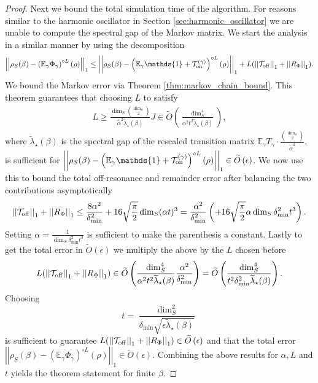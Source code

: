 \documentclass{article}
\newcommand{\on}{\rm on}
\newcommand{\off}{\rm off}
\newcommand{\norm}[1]{\left|\left| #1 \right|\right|}
\newcommand{\EE}{\mathbb{E}}
\newcommand{\TT}{\mathcal{T}}
\newcommand{\bigotilde}[1]{\widetilde{O} \left( #1 \right)}
\newcommand{\identity}{\mathds{1}}
\begin{document}
\begin{proof}
Next we bound the total simulation time of the algorithm. For reasons similar to the harmonic oscillator in Section \ref{sec:harmonic_oscillator} we are unable to compute the spectral gap of the Markov matrix. We start the analysis in a similar manner by using the decomposition
\begin{equation}
    \norm{\rho_S(\beta) - \left(\EE_\gamma \Phi_\gamma\right)^{\circ L}(\rho)}_1 \le \norm{\rho_S(\beta) - \left(\EE_\gamma \identity + \TT_{\on}^{(\gamma)}\right)^{\circ L}(\rho)}_1 + L(\norm{\TT_{\off}}_1 + \norm{R_{\Phi}}_1 ).
\end{equation}
We bound the Markov error via Theorem \ref{thm:markov_chain_bound}. This theorem guarantees that choosing $L$ to satisfy
\begin{align}
    L \ge \frac{\dim_S \binom{\dim_S}{2}}{\widetilde{\alpha}^2 \widetilde{\lambda}_\star(\beta)} J \in \bigotilde{\frac{\dim_S^4}{\alpha^2 t^2 \widetilde{\lambda}_\star(\beta)}},
\end{align}
where $\widetilde{\lambda}_\star(\beta)$ is the spectral gap of the rescaled transition matrix $\EE_\gamma T_\gamma \cdot \frac{\binom{\dim_S}{2}}{\widetilde{\alpha}^2}$, is sufficient for $\norm{\rho_S(\beta) - \left(\EE_\gamma \identity + \TT_{\on}^{(\gamma)}\right)^{\circ L}(\rho)}_1 \in \bigotilde{\epsilon}$. We now use this to bound the total off-resonance and remainder error after balancing the two contributions asymptotically
\begin{align}
    \norm{\TT_{\off}}_1 + \norm{R_{\Phi}}_1 \le \frac{8\alpha^2}{\delta_{\min}^2} + 16 \sqrt{\frac{\pi}{2}} \dim_S (\alpha t)^3 = \frac{\alpha^2}{\delta_{\min}^2} \left( + 16 \sqrt{\frac{\pi}{2}}  \alpha \dim_S \delta_{\min}^2 t^3\right).
\end{align}
Setting $\alpha = \frac{1}{\dim_S \delta_{\min}^2 t^3}$ is sufficient to make the parenthesis a constant. Lastly to get the total error in $\bigotilde{\epsilon}$ we multiply the above by the $L$ chosen before
\begin{align}
    L (\norm{\TT_{\off}}_1 + \norm{R_{\Phi}}_1) \in \bigotilde{\frac{\dim_S^4}{\alpha^2 t^2 \widetilde{\lambda}_\star(\beta)} \frac{\alpha^2}{\delta_{\min}^2}} = \bigotilde{\frac{\dim_S^4}{ t^2 \delta_{\min}^2 \widetilde{\lambda}_\star(\beta)} }.
\end{align}
Choosing
\begin{equation}
    t = \frac{\dim_S^2}{\delta_{\min} \sqrt{\epsilon \widetilde{\lambda}_\star(\beta)}} 
\end{equation}
is sufficient to guarantee $L (\norm{\TT_{\off}}_1 + \norm{R_{\Phi}}_1) \in \bigotilde{\epsilon}$ and that the total error $\norm{\rho_S(\beta) - \left( \EE_\gamma \Phi_\gamma \right)^{\circ L}(\rho)}_1 \in \bigotilde{\epsilon}$. Combining the above results for $\alpha, L$ and $t$ yields the theorem statement for finite $\beta$. 


\end{proof}
\end{document}
